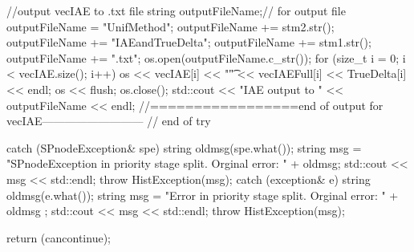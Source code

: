 \begin{DoxyCode}
{{         //output vecIAE to .txt file
      string outputFileName;// for output file
      outputFileName = "UnifMethod";
      outputFileName += stm2.str();
      outputFileName += "IAEandTrueDelta";
      outputFileName += stm1.str();
      outputFileName += ".txt";
      os.open(outputFileName.c_str());
      for (size_t i = 0; i < vecIAE.size(); i++){
        os << vecIAE[i] << "\t" << vecIAEFull[i] << TrueDelta[i] << endl;
      }
      os << flush;
      os.close();
      std::cout << "IAE output to " << outputFileName << endl;
      //=================end of output for vecIAE---------------------------      
   } // end of try
    
    catch (SPnodeException& spe) {
        string oldmsg(spe.what());
        string msg = "SPnodeException in priority stage split.  Orginal error: 
      "
                                    + oldmsg;
        std::cout << msg << std::endl;
        throw HistException(msg);
    }
    catch (exception& e) {
        string oldmsg(e.what());
        string msg = "Error in priority stage split.  Orginal error: " + oldmsg
      ;
        std::cout << msg << std::endl;
        throw HistException(msg);
    }
    
   return (cancontinue);
}
\end{DoxyCode}
